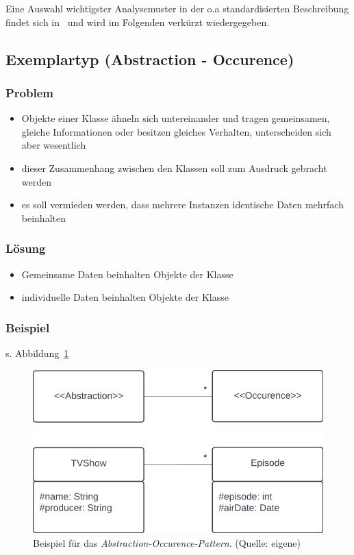 \noindent
Eine Auswahl wichtigster Analysemuster in der o.a standardisierten Beschreibung findet sich in~\cite[22 ff.]{Wed09b} und wird im Folgenden verkürzt wiedergegeben.

\subsection{Exemplartyp (Abstraction - Occurence)}

\subsubsection*{Problem}
\begin{itemize}
    \item Objekte einer Klasse ähneln sich untereinander und tragen gemeinsamen, gleiche Informationen oder besitzen gleiches  Verhalten, unterscheiden sich aber wesentlich
    \item dieser Zusammenhang zwischen den Klassen soll zum Ausdruck gebracht werden
    \item es soll vermieden werden, dass mehrere Instanzen identische Daten mehrfach beinhalten
\end{itemize}

\subsubsection*{Lösung}
\begin{itemize}
    \item Gemeinsame Daten beinhalten Objekte der Klasse 
    \item individuelle Daten beinhalten Objekte der Klasse 
\end{itemize}

\subsubsection*{Beispiel}
s. Abbildung~\ref{fig:abstractionoccurence}

\begin{figure}
    \centering
    \includegraphics[scale=0.4]{part two/Objektorientierte Analyse/img/abstractionoccurence}
    \caption{Beispiel für das \textit{Abstraction-Occurence-Pattern}. (Quelle: eigene)}
    \label{fig:abstractionoccurence}
\end{figure}


